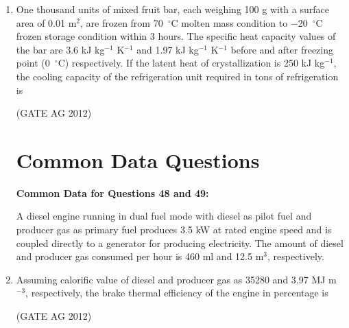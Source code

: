 \documentclass[journal]{IEEEtran}
\begin{document}
\begin{enumerate}
\item
 One thousand units of mixed fruit bar, each weighing 100 g with a surface area of 0.01 m$^2$, are frozen from 70~$^\circ$C molten mass condition to $-$20~$^\circ$C frozen storage condition within 3 hours. The specific heat capacity values of the bar are 3.6 kJ kg$^{-1}$ K$^{-1}$ and 1.97 kJ kg$^{-1}$ K$^{-1}$ before and after freezing point (0~$^\circ$C) respectively. If the latent heat of crystallization is 250 kJ kg$^{-1}$, the cooling capacity of the refrigeration unit required in tons of refrigeration is
\begin{enumerate}
\end{enumerate}
\hfill(GATE AG 2012)\\

\medskip

\section*{Common Data Questions}

\textbf{Common Data for Questions 48 and 49:}

A diesel engine running in dual fuel mode with diesel as pilot fuel and producer gas as primary fuel produces 3.5 kW at rated engine speed and is coupled directly to a generator for producing electricity. The amount of diesel and producer gas consumed per hour is 460 ml and 12.5 m$^3$, respectively.

\item
 Assuming calorific value of diesel and producer gas as 35280 and 3.97 MJ m$^{-3}$, respectively, the brake thermal efficiency of the engine in percentage is
\begin{enumerate}
\end{enumerate}
\hfill(GATE AG 2012)\\

\medskip


\end{enumerate}
\end{document}
